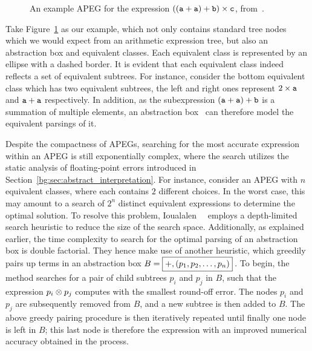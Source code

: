\begin{figure}[ht]
    \caption{%
        An example APEG for the expression $\left( \left( \texttt{a} + \texttt{a} \right)
        + \texttt{b} \right) \times \texttt{c}$, from~\cite{martel12}.
    }\label{bg:fig:apeg}
\end{figure}
Take Figure~\ref{bg:fig:apeg} as our example, which not only contains standard
tree nodes which we would expect from an arithmetic expression tree, but
also an abstraction box and equivalent classes.  Each equivalent class is
represented by an ellipse with a dashed border.  It is evident that each
equivalent class indeed reflects a set of equivalent subtrees.  For instance,
consider the bottom equivalent class which has two equivalent subtrees,
the left and right ones represent $2 \times \texttt{a}$ and $\texttt{a} + \texttt{a}$
respectively.  In addition, as the subexpression $(\texttt{a} + \texttt{a}) + \texttt{b}$ is
a summation of multiple elements, an abstraction box \fbox{$+, (\vara, \vara,
\varb)$}\, can therefore model the equivalent parsings of it.

Despite the compactness of APEGs, searching for the most accurate
expression within an APEG is still exponentially complex, where the search
utilizes the static analysis of floating-point errors introduced in
Section~\ref{bg:sec:abstract_interpretation}.  For instance, consider an APEG
with $n$ equivalent classes, where each contains $2$ different choices.  In
the worst case, this may amount to a search of $2^n$ distinct equivalent
expressions to determine the optimal solution.  To resolve this problem,
Ioualalen~\etal~\cite{ioualalen} employs a depth-limited search heuristic
to reduce the size of the search space\footnotemark[2].  Additionally, as
explained earlier, the time complexity to search for the optimal parsing of an
abstraction box is double factorial.  They hence make use of another heuristic,
which greedily pairs up terms in an abstraction box $B = \text{\fbox{$+,
\left(p_1, p_2, \mathellipsis, p_n\right)$}}$\,.  To begin, the method searches
for a pair of child subtrees $p_i$ and $p_j$ in $B$, such that the expression
$p_i \otimes p_j$ computes with the smallest round-off error.  The nodes
$p_i$ and $p_j$ are subsequently removed from $B$, and a new subtree
is then added to $B$.  The above greedy pairing procedure is then iteratively
repeated until finally one node is left in $B$; this last node is therefore
the expression with an improved numerical accuracy obtained in the process.

